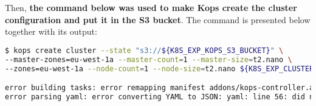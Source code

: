 Then, \textbf{the command below was used to make Kops create the cluster configuration and put it in the S3 bucket}. The command is presented below together with its output:
\begin{lstlisting}[basicstyle=\tiny,caption={Command used to make Kops create the cluster configuration and put it in the S3 bucket},captionpos=b,language=Bash,xleftmargin=1cm]
$ kops create cluster --state "s3://${K8S_EXP_KOPS_S3_BUCKET}" \
--master-zones=eu-west-1a --master-count=1 --master-size=t2.nano \
--zones=eu-west-1a --node-count=1 --node-size=t2.nano ${K8S_EXP_CLUSTER_NAME}

error building tasks: error remapping manifest addons/kops-controller.addons.k8s.io/k8s-1.16.yaml: \
error parsing yaml: error converting YAML to JSON: yaml: line 56: did not find expected alphabetic or numeric character
\end{lstlisting}

